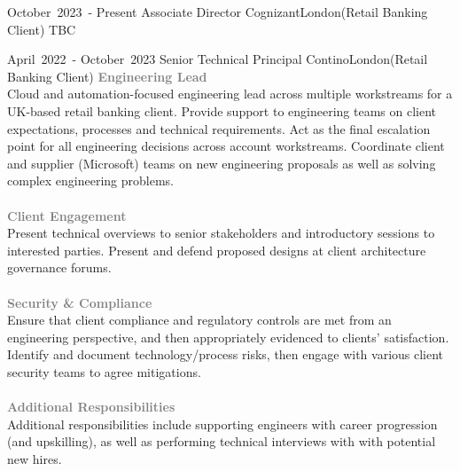 
\edef\hc{\string:}
\cventry %
  {\mbox{October 2023 -} \mbox{Present}}
  {Associate Director}
  {Cognizant}{London}{(Retail Banking Client)}
  {
    TBC
  }


\cventry %
  {\mbox{April 2022 -} \mbox{October 2023}}
  {Senior Technical Principal}
  {Contino}{London}{(Retail Banking Client)}
  {
    \textcolor{gray}{\textbf{Engineering Lead}}\\ 
    Cloud and automation-focused engineering lead across multiple workstreams 
    for a UK-based retail banking client. Provide support to engineering teams
    on client expectations, processes and technical requirements.
    Act as the final escalation point for all engineering decisions across 
    account workstreams. Coordinate client and supplier (Microsoft) teams on
    new engineering proposals as well as solving complex engineering problems.\\\\
    \textcolor{gray}{\textbf{Client Engagement}}\\ 
    Present technical overviews to senior stakeholders and introductory sessions
    to interested parties. Present and defend proposed designs at client 
    architecture governance forums.\\\\
    \textcolor{gray}{\textbf{Security \& Compliance}}\\ 
    Ensure that client compliance and regulatory controls are met from an engineering 
    perspective, and then appropriately evidenced to clients' satisfaction.
    Identify and document technology/process risks, then engage with various client
    security teams to agree mitigations.\\\\
    \textcolor{gray}{\textbf{Additional Responsibilities}}\\ 
    Additional responsibilities include supporting engineers with career
    progression (and upskilling), as well as performing technical interviews with
    with potential new hires.\\
  }

